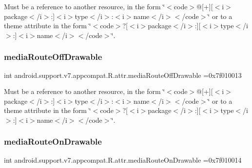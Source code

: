 Must be a reference to another resource, in the form \char`\"{}$<$code$>$@\mbox{[}+\mbox{]}\mbox{[}$<$i$>$package$<$/i$>$\+:\mbox{]}$<$i$>$type$<$/i$>$\+:$<$i$>$name$<$/i$>$$<$/code$>$\char`\"{} or to a theme attribute in the form \char`\"{}$<$code$>$?\mbox{[}$<$i$>$package$<$/i$>$\+:\mbox{]}\mbox{[}$<$i$>$type$<$/i$>$\+:\mbox{]}$<$i$>$name$<$/i$>$$<$/code$>$\char`\"{}. \mbox{\label{classandroid_1_1support_1_1v7_1_1appcompat_1_1R_1_1attr_a10f7595581264a30fea21acb31d26330}} 
\subsubsection{\texorpdfstring{media\+Route\+Off\+Drawable}{mediaRouteOffDrawable}}
{\footnotesize\ttfamily int android.\+support.\+v7.\+appcompat.\+R.\+attr.\+media\+Route\+Off\+Drawable =0x7f010013\hspace{0.3cm}{\ttfamily [static]}}

Must be a reference to another resource, in the form \char`\"{}$<$code$>$@\mbox{[}+\mbox{]}\mbox{[}$<$i$>$package$<$/i$>$\+:\mbox{]}$<$i$>$type$<$/i$>$\+:$<$i$>$name$<$/i$>$$<$/code$>$\char`\"{} or to a theme attribute in the form \char`\"{}$<$code$>$?\mbox{[}$<$i$>$package$<$/i$>$\+:\mbox{]}\mbox{[}$<$i$>$type$<$/i$>$\+:\mbox{]}$<$i$>$name$<$/i$>$$<$/code$>$\char`\"{}. \mbox{\label{classandroid_1_1support_1_1v7_1_1appcompat_1_1R_1_1attr_a02adfff341757bb08f81109b14ee25a0}} 
\subsubsection{\texorpdfstring{media\+Route\+On\+Drawable}{mediaRouteOnDrawable}}
{\footnotesize\ttfamily int android.\+support.\+v7.\+appcompat.\+R.\+attr.\+media\+Route\+On\+Drawable =0x7f010014\hspace{0.3cm}{\ttfamily [static]}}

